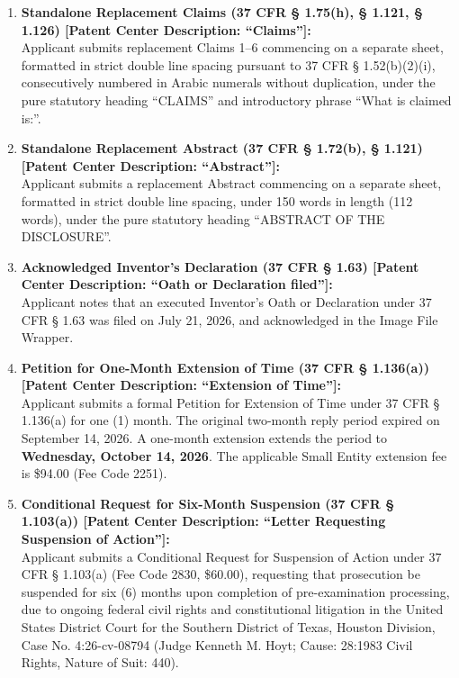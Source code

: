 \documentclass[11pt,letterpaper]{article}
\begin{document}
\begin{enumerate}[leftmargin=*]
    \item \textbf{Standalone Replacement Claims (37 CFR \S{} 1.75(h), \S{} 1.121, \S{} 1.126) [Patent Center Description: ``Claims'']:} \\
    Applicant submits replacement Claims 1--6 commencing on a separate sheet, formatted in strict double line spacing pursuant to 37 CFR \S{} 1.52(b)(2)(i), consecutively numbered in Arabic numerals without duplication, under the pure statutory heading ``CLAIMS'' and introductory phrase ``What is claimed is:''.

    \item \textbf{Standalone Replacement Abstract (37 CFR \S{} 1.72(b), \S{} 1.121) [Patent Center Description: ``Abstract'']:} \\
    Applicant submits a replacement Abstract commencing on a separate sheet, formatted in strict double line spacing, under 150 words in length (112 words), under the pure statutory heading ``ABSTRACT OF THE DISCLOSURE''.

    \item \textbf{Acknowledged Inventor's Declaration (37 CFR \S{} 1.63) [Patent Center Description: ``Oath or Declaration filed'']:} \\
    Applicant notes that an executed Inventor's Oath or Declaration under 37 CFR \S{} 1.63 was filed on July 21, 2026, and acknowledged in the Image File Wrapper.

    \item \textbf{Petition for One-Month Extension of Time (37 CFR \S{} 1.136(a)) [Patent Center Description: ``Extension of Time'']:} \\
    Applicant submits a formal Petition for Extension of Time under 37 CFR \S{} 1.136(a) for one (1) month. The original two-month reply period expired on September 14, 2026. A one-month extension extends the period to \textbf{Wednesday, October 14, 2026}. The applicable Small Entity extension fee is \$94.00 (Fee Code 2251).

    \item \textbf{Conditional Request for Six-Month Suspension (37 CFR \S{} 1.103(a)) [Patent Center Description: ``Letter Requesting Suspension of Action'']:} \\
    Applicant submits a Conditional Request for Suspension of Action under 37 CFR \S{} 1.103(a) (Fee Code 2830, \$60.00), requesting that prosecution be suspended for six (6) months upon completion of pre-examination processing, due to ongoing federal civil rights and constitutional litigation in the United States District Court for the Southern District of Texas, Houston Division, Case No. 4:26-cv-08794 (Judge Kenneth M. Hoyt; Cause: 28:1983 Civil Rights, Nature of Suit: 440).
\end{enumerate}
\end{document}

